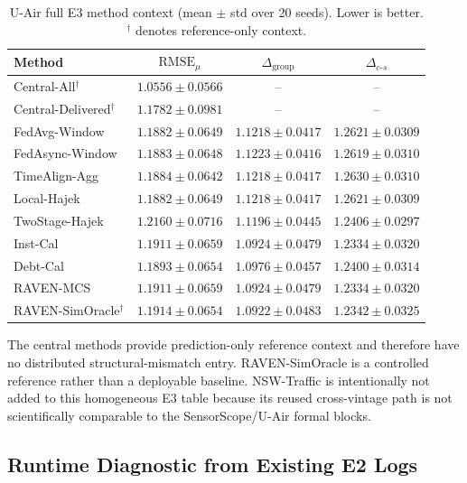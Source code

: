 \documentclass[letterpaper,journal]{IEEEtran}
\begin{document}
\begin{table}[t]
\centering
\caption{U-Air full E3 method context (mean $\pm$ std over 20 seeds).
Lower is better.  $^\dagger$ denotes reference-only context.}
\label{tab:app_e3_uair}
\scriptsize
\setlength{\tabcolsep}{4.3pt}
\begin{tabular*}{\textwidth}{@{\extracolsep{\fill}}lccc}
\toprule
Method & $\mathrm{RMSE}_{\mu}$ & $\Delta_{\mathrm{group}}$ & $\Delta_{c\text{-}s}$\\
\midrule
Central-All$^{\dagger}$ & $1.0556\pm0.0566$ & -- & -- \\
Central-Delivered$^{\dagger}$ & $1.1782\pm0.0981$ & -- & -- \\
FedAvg-Window & $1.1882\pm0.0649$ & $1.1218\pm0.0417$ & $1.2621\pm0.0309$ \\
FedAsync-Window & $1.1883\pm0.0648$ & $1.1223\pm0.0416$ & $1.2619\pm0.0310$ \\
TimeAlign-Agg & $1.1884\pm0.0642$ & $1.1218\pm0.0417$ & $1.2630\pm0.0310$ \\
Local-Hajek & $1.1882\pm0.0649$ & $1.1218\pm0.0417$ & $1.2621\pm0.0309$ \\
TwoStage-Hajek & $1.2160\pm0.0716$ & $1.1196\pm0.0445$ & $1.2406\pm0.0297$ \\
Inst-Cal & $1.1911\pm0.0659$ & $1.0924\pm0.0479$ & $1.2334\pm0.0320$ \\
Debt-Cal & $1.1893\pm0.0654$ & $1.0976\pm0.0457$ & $1.2400\pm0.0314$ \\
RAVEN-MCS & $1.1911\pm0.0659$ & $1.0924\pm0.0479$ & $1.2334\pm0.0320$ \\
RAVEN-SimOracle$^{\dagger}$ & $1.1914\pm0.0654$ & $1.0922\pm0.0483$ & $1.2342\pm0.0325$ \\
\bottomrule
\end{tabular*}
\end{table}

The central methods provide prediction-only reference context and therefore
have no distributed structural-mismatch entry.  RAVEN-SimOracle is a controlled
reference rather than a deployable baseline.  NSW-Traffic is intentionally not
added to this homogeneous E3 table because its reused cross-vintage path is not
scientifically comparable to the SensorScope/U-Air formal blocks.

\subsection{Runtime Diagnostic from Existing E2 Logs}
\label{app:runtime}
\end{document}

